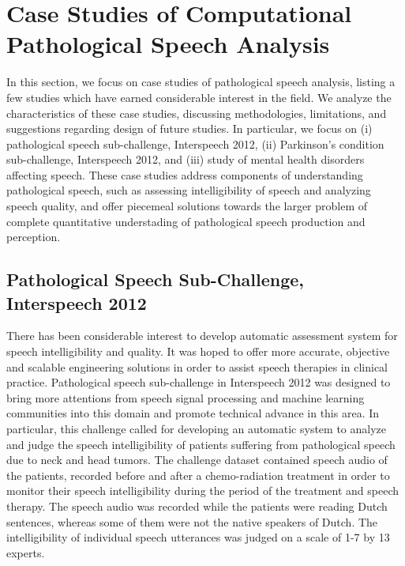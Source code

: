 \documentclass{article}
\begin{document}
\section{Case Studies of Computational Pathological Speech Analysis}
In this section, we focus on case studies of pathological speech analysis, listing a few studies which have earned considerable interest in the field. We analyze the characteristics of these case studies, discussing methodologies, limitations, and suggestions regarding design of future studies.
In particular, we focus on (i) pathological speech sub-challenge, Interspeech 2012, (ii) Parkinson's condition sub-challenge, Interspeech 2012, and (iii) study of mental health disorders affecting speech. 
These case studies address components of understanding pathological speech, such as assessing intelligibility of speech and analyzing speech quality, and offer piecemeal solutions towards the larger problem of complete quantitative understading of pathological speech production and perception.

\subsection{Pathological Speech Sub-Challenge, Interspeech 2012}
There has been considerable interest to develop automatic assessment system for speech intelligibility and quality. It was hoped to offer more accurate, objective and scalable engineering solutions in order to assist speech therapies in clinical practice. Pathological speech sub-challenge in Interspeech 2012 was designed to bring more attentions from speech signal processing and machine learning communities into this domain and promote technical advance in this area.
In particular, this challenge called for developing an automatic system to analyze and judge the speech intelligibility of patients suffering from pathological speech due to neck and head tumors.
The challenge dataset contained speech audio of the patients, recorded before and after a chemo-radiation treatment in order to monitor their speech intelligibility during the period of the treatment and speech therapy.
The speech audio was recorded while the patients were reading Dutch sentences, whereas some of them were not the native speakers of Dutch.
The intelligibility of individual speech utterances was judged on a scale of 1-7 by 13 experts.
\end{document}
